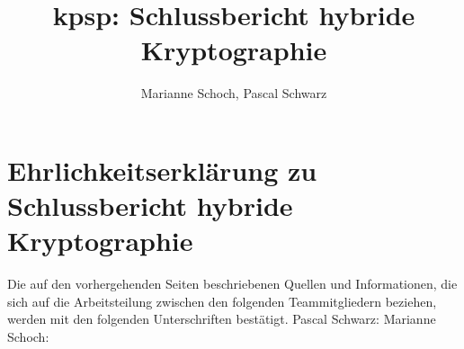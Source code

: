 \documentclass[11pt,a4paper,parskip=half]{scrartcl}
\title{kpsp: Schlussbericht hybride Kryptographie}
\author{Marianne Schoch, Pascal Schwarz}
\begin{document}
\section*{Ehrlichkeitserklärung zu \glqq{}Schlussbericht hybride Kryptographie\grqq{}}
Die auf den vorhergehenden Seiten beschriebenen Quellen und Informationen, die sich auf die Arbeitsteilung zwischen den folgenden Teammitgliedern beziehen, werden mit den folgenden Unterschriften bestätigt.
\newline\newline\newline\newline\newline
Pascal Schwarz:
\newline\newline\newline\newline\newline
Marianne Schoch:
\end{document}

